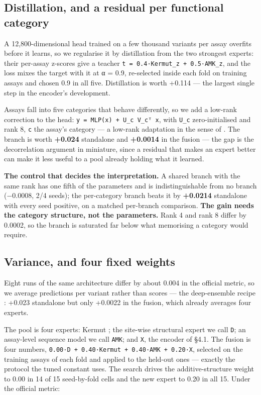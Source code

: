 \documentclass{article}
\begin{document}
\subsection{Distillation, and a residual per functional category}\label{distillation-and-a-residual-per-functional-category}

A 12,800-dimensional head trained on a few thousand variants per assay overfits before it learns, so we regularise it by distillation \cite{hinton2015distilling} from the two strongest experts: their per-assay z-scores give a teacher \texttt{t\ =\ 0.4·Kermut\_z\ +\ 0.5·AMK\_z}, and the
loss mixes the target with it at α = 0.9, re-selected inside each fold on training assays and chosen 0.9 in all
five. Distillation is worth +0.114 --- the largest single step in the encoder's development.

Assays fall into five categories that behave differently, so we add a low-rank correction to the head:
\texttt{y\ =\ MLP(x)\ +\ U\_c\ V\_cᵀ\ x}, with \texttt{U\_c} zero-initialised and rank 8, \texttt{c} the assay's category --- a low-rank
adaptation in the sense of \cite{hu2022lora}. The branch is
worth \textbf{+0.024} standalone and \textbf{+0.0014} in the fusion --- the gap is the decorrelation argument in
miniature, since a residual that makes an expert better can make it less useful to a pool already holding
what it learned.

\textbf{The control that decides the interpretation.} A shared branch with the same rank has one fifth of the
parameters and is indistinguishable from no branch (−0.0008, 2/4 seeds); the per-category branch beats it
by \textbf{+0.0214} standalone with every seed positive, on a matched per-branch comparison. \textbf{The gain needs
the category structure, not the parameters.} Rank 4 and rank 8 differ by 0.0002, so the branch is
saturated far below what memorising a category would require.

\subsection{Variance, and four fixed weights}\label{variance-and-four-fixed-weights}

Eight runs of the same architecture differ by about 0.004 in the official metric, so we average predictions per
variant rather than scores --- the deep-ensemble recipe \cite{lakshminarayanan2017deep}: +0.023 standalone but only +0.0022 in the fusion, which already averages four experts.

The pool is four experts: Kermut \cite{kermut}; the site-wise structural expert we call \texttt{D}; an assay-level sequence model we call \texttt{AMK}; and \texttt{X}, the encoder of §4.1. The fusion is four numbers, \texttt{0.00·D\ +\ 0.40·Kermut\ +\ 0.40·AMK\ +\ 0.20·X}, selected on the training assays
of each fold and applied to the held-out ones --- exactly the protocol the tuned constant uses. The search drives the additive-structure weight to 0.00 in 14 of 15 seed-by-fold cells and the new expert to 0.20
in all 15. Under the official metric:
\end{document}
